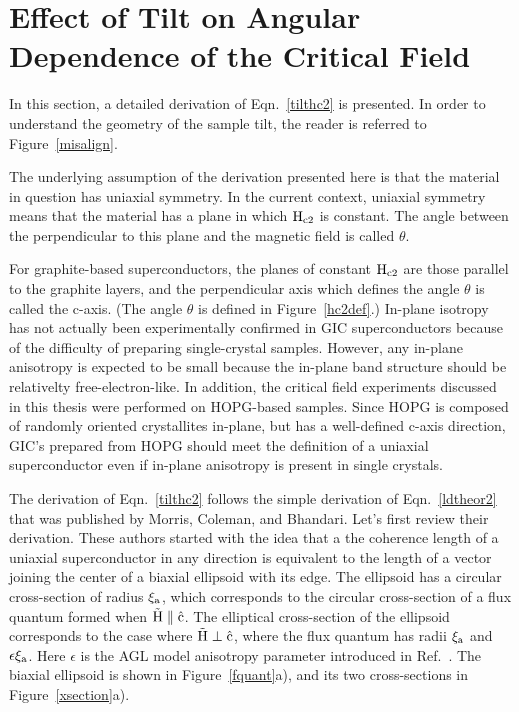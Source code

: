\chapter{Effect of Tilt on An\-gul\-ar De\-pen\-dence of the Crit\-ical Field}
\label{tiltderiv}
\pagestyle{headings}

        In this section, a detailed derivation of Eqn.~\ref{tilthc2} is
presented.   In order to understand the geometry of the sample tilt, the
reader is referred to Figure~\ref{misalign}.

        The underlying assumption of  the derivation presented here is that
the material in question has  uniaxial symmetry.   In the current  context,
uniaxial symmetry means that the material has a plane in which $\rm H_{c2}$
is constant.  The  angle between  the perpendicular  to this plane  and the
magnetic field is called $\theta$.  

        For graphite-based  superconductors,  the planes  of  constant $\rm
H_{c2}$ are  those parallel to the  graphite layers, and  the perpendicular
axis which defines the  angle $\theta$ is  called the  c-axis.   (The angle
$\theta$ is defined in  Figure~\ref{hc2def}.)    In-plane isotropy has  not
actually been  experimentally confirmed in  GIC superconductors  because of
the difficulty of  preparing single-crystal samples.  However, any in-plane
anisotropy  is expected to  be  small   because the in-plane band structure
should be relativelty  free-electron-like.\cite{holzwarth88} In addition, the
critical  field experiments discussed  in   this thesis were  performed  on
HOPG-based samples.   Since  HOPG    is  composed of  randomly     oriented
crystallites  in-plane, but  has a well-defined c-axis direction,\cite{I94}
GIC's   prepared from  HOPG   should meet the  definition  of   a  uniaxial
superconductor even if in-plane anisotropy is present in single crystals.

        The derivation of Eqn.~\ref{tilthc2} follows  the simple derivation
of  Eqn.~\ref{ldtheor2} that  was    published by   Morris,   Coleman,  and
Bhandari.\cite{morris72}  Let's  first  review   their  derivation.   These
authors started with the  idea  that  a the coherence  length of a uniaxial
superconductor in  any  direction is equivalent to  the  length of a vector
joining the center of a biaxial ellipsoid with its edge.  The ellipsoid has
a circular  cross-section of radius $\rm \xi_a$,   which corresponds to the
circular cross-section of a flux quantum formed when $\rm \vec{H} \parallel
\hat{c}$.  The elliptical cross-section of the ellipsoid corresponds to the
case where $\rm \vec{H}
\perp  \hat{c}$,  where the flux  quantum  has radii $\rm  \xi_a$ and  $\rm
\epsilon \xi_a$.  Here  $\epsilon$ is  the AGL  model anisotropy  parameter
introduced in Ref.~\cite{morris72}.  The biaxial ellipsoid  is shown in
Figure~\ref{fquant}a), and its two cross-sections in Figure~\ref{xsection}a).

